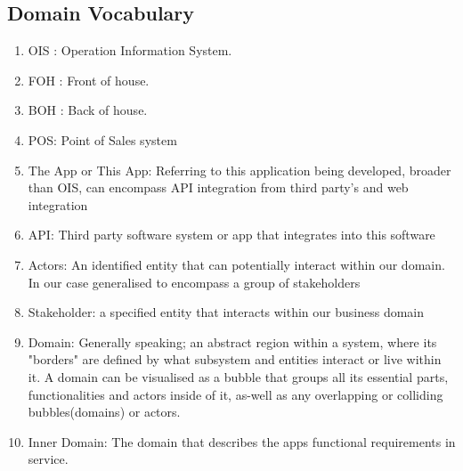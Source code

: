 \documentclass{article}
\begin{document}
\subsection{Domain Vocabulary}
\begin{enumerate}
    \item OIS : Operation Information System.
    \item FOH : Front of house.
    \item BOH : Back of house.
    \item POS: Point of Sales system
    \item The App or This App: Referring to this application being developed, broader than OIS, can encompass API integration from third party's and web integration
    \item API: Third party software system or app that integrates into this software
    \item Actors: An identified entity that can potentially interact within our domain. In our case generalised to encompass a group of stakeholders
    \item Stakeholder: a specified entity that interacts within our business domain
    \item Domain: Generally speaking; an abstract region within a system, where its "borders" are defined by what subsystem and entities interact or live within it. A domain can be visualised as a bubble that groups all its essential parts, functionalities and actors inside of it, as-well as any overlapping or colliding bubbles(domains) or actors. 
    \item Inner Domain: The domain that describes the apps functional requirements in service.
    
\end{enumerate}
\end{document}
